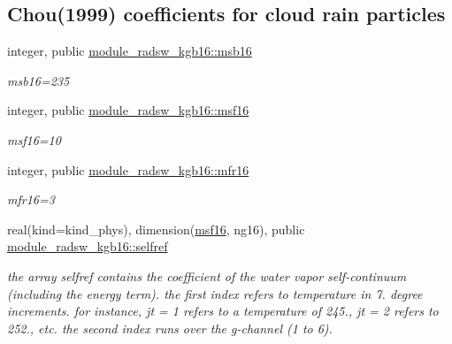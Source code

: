 \subsection*{Chou(1999) coefficients for cloud rain particles}
\begin{DoxyCompactItemize}
\item 
\mbox{\label{group__module__radsw__kgbnn_ga2ce1ab36897fb1fc7d85cbf7fe539e59}} 
integer, public \hyperlink{group__module__radsw__kgbnn_ga2ce1ab36897fb1fc7d85cbf7fe539e59}{module\+\_\+radsw\+\_\+kgb16\+::msb16}
\begin{DoxyCompactList}\small\item\em msb16=235 \end{DoxyCompactList}\item 
\mbox{\label{group__module__radsw__kgbnn_gab35df3f7d231e98fbef5738119138907}} 
integer, public \hyperlink{group__module__radsw__kgbnn_gab35df3f7d231e98fbef5738119138907}{module\+\_\+radsw\+\_\+kgb16\+::msf16}
\begin{DoxyCompactList}\small\item\em msf16=10 \end{DoxyCompactList}\item 
\mbox{\label{group__module__radsw__kgbnn_gaeee3fe8e44f6fbd9a6a008bc9f97f37c}} 
integer, public \hyperlink{group__module__radsw__kgbnn_gaeee3fe8e44f6fbd9a6a008bc9f97f37c}{module\+\_\+radsw\+\_\+kgb16\+::mfr16}
\begin{DoxyCompactList}\small\item\em mfr16=3 \end{DoxyCompactList}\item 
\mbox{\label{group__module__radsw__kgbnn_ga77d98f3fb766d4abfd494332ce67c2c2}} 
real(kind=kind\+\_\+phys), dimension(\hyperlink{group__module__radsw__kgbnn_gab35df3f7d231e98fbef5738119138907}{msf16}, ng16), public \hyperlink{group__module__radsw__kgbnn_ga77d98f3fb766d4abfd494332ce67c2c2}{module\+\_\+radsw\+\_\+kgb16\+::selfref}
\begin{DoxyCompactList}\small\item\em the array selfref contains the coefficient of the water vapor self-\/continuum (including the energy term). the first index refers to temperature in 7. degree increments. for instance, jt = 1 refers to a temperature of 245., jt = 2 refers to 252., etc. the second index runs over the g-\/channel (1 to 6). \end{DoxyCompactList}\item 

\end{DoxyCompactItemize}
